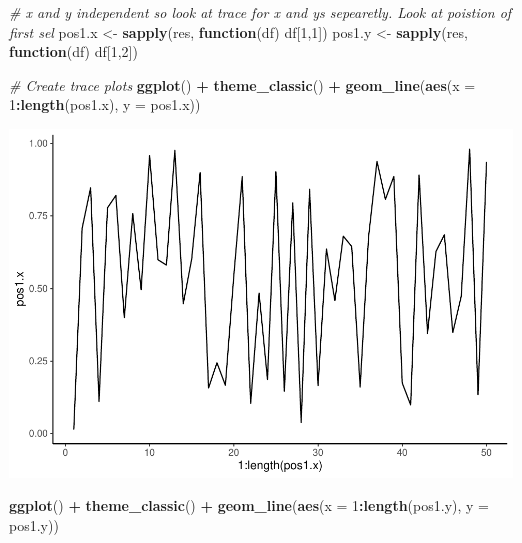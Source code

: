 \documentclass[
]{article}
\newenvironment{Shaded}{\begin{snugshade}}{\end{snugshade}}
\newcommand{\CommentTok}[1]{\textcolor[rgb]{0.56,0.35,0.01}{\textit{#1}}}
\newcommand{\ControlFlowTok}[1]{\textcolor[rgb]{0.13,0.29,0.53}{\textbf{#1}}}
\newcommand{\DataTypeTok}[1]{\textcolor[rgb]{0.13,0.29,0.53}{#1}}
\newcommand{\DecValTok}[1]{\textcolor[rgb]{0.00,0.00,0.81}{#1}}
\newcommand{\KeywordTok}[1]{\textcolor[rgb]{0.13,0.29,0.53}{\textbf{#1}}}
\newcommand{\NormalTok}[1]{#1}
\newcommand{\OperatorTok}[1]{\textcolor[rgb]{0.81,0.36,0.00}{\textbf{#1}}}
\newcommand{\StringTok}[1]{\textcolor[rgb]{0.31,0.60,0.02}{#1}}
\begin{document}
\begin{Shaded}
\begin{Highlighting}[]
\CommentTok{# x and y independent so look at trace for x and ys sepearetly. Look at poistion of first sel}
\NormalTok{pos1.x <-}\StringTok{ }\KeywordTok{sapply}\NormalTok{(res, }\ControlFlowTok{function}\NormalTok{(df) df[}\DecValTok{1}\NormalTok{,}\DecValTok{1}\NormalTok{])}
\NormalTok{pos1.y <-}\StringTok{ }\KeywordTok{sapply}\NormalTok{(res, }\ControlFlowTok{function}\NormalTok{(df) df[}\DecValTok{1}\NormalTok{,}\DecValTok{2}\NormalTok{])}

\CommentTok{# Create trace plots }
\KeywordTok{ggplot}\NormalTok{() }\OperatorTok{+}\StringTok{ }\KeywordTok{theme_classic}\NormalTok{() }\OperatorTok{+}\StringTok{ }\KeywordTok{geom_line}\NormalTok{(}\KeywordTok{aes}\NormalTok{(}\DataTypeTok{x =} \DecValTok{1}\OperatorTok{:}\KeywordTok{length}\NormalTok{(pos1.x), }\DataTypeTok{y =}\NormalTok{ pos1.x))}
\end{Highlighting}
\end{Shaded}

\includegraphics{project2_files/figure-latex/unnamed-chunk-27-1.pdf}

\begin{Shaded}
\begin{Highlighting}[]
\KeywordTok{ggplot}\NormalTok{() }\OperatorTok{+}\StringTok{ }\KeywordTok{theme_classic}\NormalTok{() }\OperatorTok{+}\StringTok{ }\KeywordTok{geom_line}\NormalTok{(}\KeywordTok{aes}\NormalTok{(}\DataTypeTok{x =} \DecValTok{1}\OperatorTok{:}\KeywordTok{length}\NormalTok{(pos1.y), }\DataTypeTok{y =}\NormalTok{ pos1.y))}
\end{Highlighting}
\end{Shaded}
\end{document}
